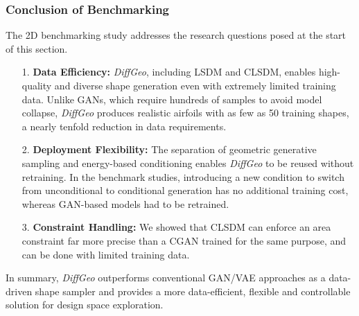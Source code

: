 \subsubsection{Conclusion of Benchmarking}

The 2D benchmarking study addresses the research questions posed at the start of this section.

\begin{itemize}
    \item[1.] \textbf{Data Efficiency:} \textit{DiffGeo}, including LSDM and CLSDM, enables high-quality and diverse shape generation even with extremely limited training data. Unlike GANs, which require hundreds of samples to avoid model collapse, \textit{DiffGeo} produces realistic airfoils with as few as 50 training shapes, a nearly tenfold reduction in data requirements.

    \item[2.] \textbf{Deployment Flexibility:} The separation of geometric generative sampling and energy-based conditioning enables \textit{DiffGeo} to be reused without retraining. In the benchmark studies, introducing a new condition to switch from unconditional to conditional generation has no additional training cost, whereas GAN-based models had to be retrained.

    \item[3.] \textbf{Constraint Handling:} We showed that CLSDM can enforce an area constraint far more precise than a CGAN trained for the same purpose, and can be done with limited training data. 
\end{itemize}

In summary, \textit{DiffGeo} outperforms conventional GAN/VAE approaches as a data-driven shape sampler and provides a more data-efficient, flexible and controllable solution for design space exploration.